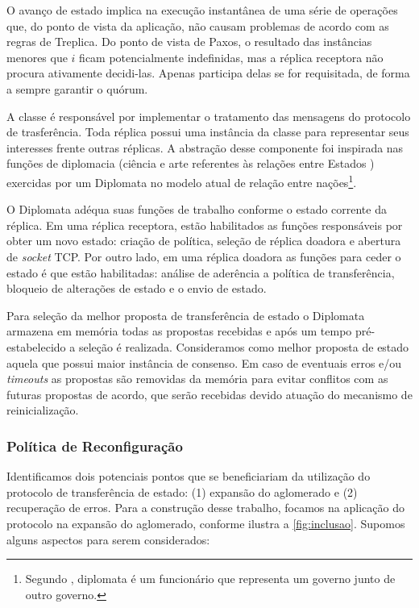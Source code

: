 O avanço de estado implica na execução instantânea de uma série de operações que, do ponto
de vista da aplicação, não causam problemas de acordo com as regras de Treplica. Do ponto
de vista de Paxos, o resultado das instâncias menores que $i$ ficam potencialmente
indefinidas, mas a réplica receptora não procura ativamente decidi-las. Apenas participa
delas se for requisitada, de forma a sempre garantir o quórum.


A classe  é responsável por implementar o tratamento das mensagens do
protocolo de trasferência. Toda réplica possui uma instância da classe
 para representar seus interesses frente outras réplicas. A abstração
desse componente foi inspirada nas funções de diplomacia (ciência e arte referentes às
relações entre Estados \cite{aurelio}) exercidas por um Diplomata no modelo atual de
relação entre nações\footnote{Segundo , diplomata é um funcionário que
representa um governo junto de outro governo.}.

O Diplomata adéqua suas funções de trabalho conforme o estado corrente da réplica. Em uma
réplica receptora, estão habilitados as funções responsáveis por obter um novo estado:
criação de política, seleção de réplica doadora e abertura de \emph{socket} TCP. Por outro
lado, em uma réplica doadora as funções para ceder o estado é que estão habilitadas:
análise de aderência a política de transferência, bloqueio de alterações de estado e o
envio de estado.

Para seleção da melhor proposta de transferência de estado o Diplomata armazena em
memória todas as propostas recebidas e após um tempo pré-estabelecido a seleção é
realizada. Consideramos como melhor proposta de estado aquela que possui maior
instância de consenso. Em caso de eventuais erros e/ou \emph{timeouts} as propostas são
removidas da memória para evitar conflitos com as futuras propostas de acordo, que serão
recebidas devido atuação do mecanismo de reinicialização.

\subsubsection{Política de Reconfiguração}

Identificamos dois potenciais pontos que se beneficiariam da utilização do protocolo de
transferência de estado: (1) expansão do aglomerado e (2) recuperação de erros. Para a
construção desse trabalho, focamos na aplicação do protocolo na expansão do aglomerado,
conforme ilustra a \autoref{fig:inclusao}. Supomos alguns aspectos para serem
considerados:

